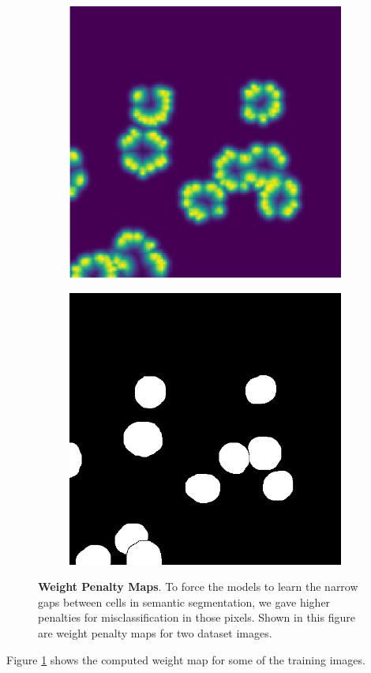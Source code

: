 \documentclass[10pt, journal, compsoc]{IEEEtran}
\begin{document}
\begin{figure}
\begin{subfigure}[b]{0.49\linewidth}
\end{subfigure}
\begin{subfigure}[b]{0.49\linewidth}
\includegraphics[width=\linewidth]{weights/108641-wmap.eps}
\end{subfigure}
\begin{subfigure}[b]{0.49\linewidth}
\includegraphics[width=\linewidth]{c127/108641-label.jpg}
\end{subfigure}
\caption{\textbf{Weight Penalty Maps}. To force the models to learn the narrow gaps between cells in semantic segmentation, we gave higher penalties for misclassification in those pixels. Shown in this figure are weight penalty maps for two dataset images.}
\label{fig:weight_map}
\end{figure}
Figure \ref{fig:weight_map} shows the computed weight map for some of the training images.
\end{document}

